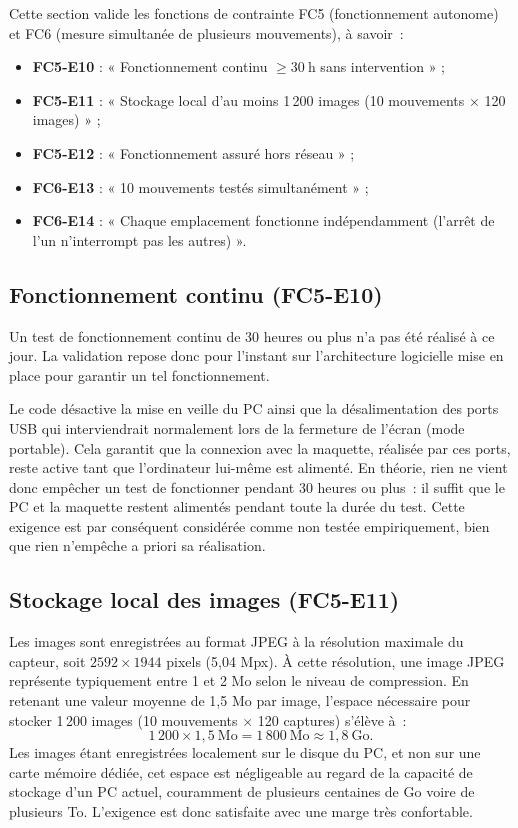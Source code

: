Cette section valide les fonctions de contrainte FC5 (fonctionnement autonome)
et FC6 (mesure simultanée de plusieurs mouvements), à savoir~:
\begin{itemize}
    \item \textbf{FC5-E10} : « Fonctionnement continu $\geq 30\ \mathrm{h}$ sans
          intervention » ;
    \item \textbf{FC5-E11} : « Stockage local d'au moins 1\,200 images (10
          mouvements $\times$ 120 images) » ;
    \item \textbf{FC5-E12} : « Fonctionnement assuré hors réseau » ;
    \item \textbf{FC6-E13} : « 10 mouvements testés simultanément » ;
    \item \textbf{FC6-E14} : « Chaque emplacement fonctionne indépendamment
          (l'arrêt de l'un n'interrompt pas les autres) ».
\end{itemize}

\subsection{Fonctionnement continu (FC5-E10)}

Un test de fonctionnement continu de 30 heures ou plus n'a pas été réalisé à ce
jour. La validation repose donc pour l'instant sur l'architecture logicielle
mise en place pour garantir un tel fonctionnement.

Le code désactive la mise en veille du PC ainsi que la désalimentation des
ports USB qui interviendrait normalement lors de la fermeture de l'écran (mode
portable). Cela garantit que la connexion avec la maquette, réalisée par ces
ports, reste active tant que l'ordinateur lui-même est alimenté. En théorie,
rien ne vient donc empêcher un test de fonctionner pendant 30 heures ou plus~:
il suffit que le PC et la maquette restent alimentés pendant toute la durée du
test. Cette exigence est par conséquent considérée comme non testée
empiriquement, bien que rien n'empêche a priori sa réalisation.

\subsection{Stockage local des images (FC5-E11)}

Les images sont enregistrées au format JPEG à la résolution maximale du
capteur, soit $2592 \times 1944$ pixels (5,04 Mpx). À cette résolution, une
image JPEG représente typiquement entre 1 et 2 Mo selon le niveau de
compression. En retenant une valeur moyenne de 1,5 Mo par image, l'espace
nécessaire pour stocker 1\,200 images (10 mouvements $\times$ 120 captures)
s'élève à~:
\[
    1\,200 \times 1{,}5\ \mathrm{Mo} = 1\,800\ \mathrm{Mo} \approx 1{,}8\ \mathrm{Go}.
\]
Les images étant enregistrées localement sur le disque du PC, et non sur une
carte mémoire dédiée, cet espace est négligeable au regard de la capacité de
stockage d'un PC actuel, couramment de plusieurs centaines de Go voire de
plusieurs To. L'exigence est donc satisfaite avec une marge très confortable.

